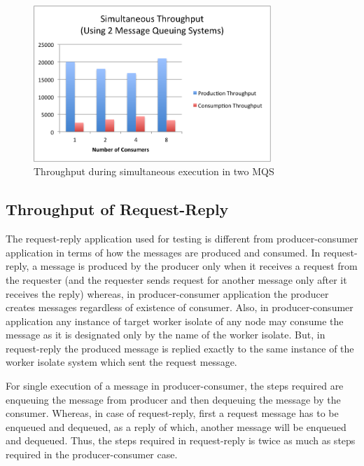\begin{figure}[H]
  \centering
  \includegraphics[width=0.8\textwidth]{figures/08simultaneous2}
  \caption[Throughput during simultaneous execution in two MQS]{Throughput during simultaneous execution in two MQS}
  \label{fig:result-simultaneous2}
\end{figure}


\subsection{Throughput of Request-Reply}
  The request-reply application used for testing is different from producer-consumer application in terms of how the messages are produced and consumed. In request-reply, a message is produced by the producer only when it receives a request from the requester (and the requester sends request for another message only after it receives the reply) whereas, in producer-consumer application the producer creates messages regardless of existence of consumer. Also, in producer-consumer application any instance of target worker isolate of any node may consume the message as it is designated only by the name of the worker isolate. But, in request-reply the produced message is replied exactly to the same instance of the worker isolate system which sent the request message.

  For single execution of a message in producer-consumer, the steps required are enqueuing the message from producer and then dequeuing the message by the consumer. Whereas, in case of request-reply, first a request message has to be enqueued and dequeued, as a reply of which, another message will be enqueued and dequeued. Thus, the steps required in request-reply is twice as much as steps required in the producer-consumer case.

